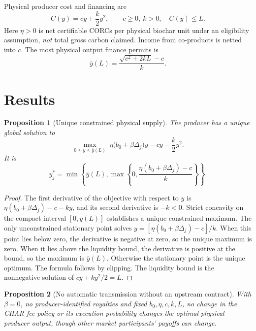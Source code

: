 \documentclass[11pt]{article}
\newtheorem{proposition}{Proposition}
\begin{document}
Physical producer cost and financing are
\begin{equation}
 C(y)=cy+\frac{k}{2}y^2,\qquad c\geq0,\ k>0,\quad C(y)\leq L.
\end{equation}
Here $\eta>0$ is net certifiable CORCs per physical biochar unit under an eligibility assumption, \emph{not} total gross carbon claimed. Income from co-products is netted into $c$. The most physical output finance permits is
\begin{equation}
 \overline y(L)=\frac{\sqrt{c^2+2kL}-c}{k}.
\end{equation}
\section{Results}
\begin{proposition}[Unique constrained physical supply]
The producer has a unique global solution to
\begin{equation}
 \max_{0\leq y\leq\overline y(L)}\;\eta\big(b_0+\beta\Delta_j\big)y-cy-\frac{k}{2}y^2.
\end{equation}
It is
\begin{equation}
 \boxed{y_j^*=\min\left\{\overline y(L),\max\left\{0,\frac{\eta(b_0+\beta\Delta_j)-c}{k}\right\}\right\}.}
\end{equation}
\end{proposition}
\begin{proof}
The first derivative of the objective with respect to $y$ is $\eta(b_0+\beta\Delta_j)-c-ky$, and its second derivative is $-k<0$. Strict concavity on the compact interval $[0,\overline y(L)]$ establishes a unique constrained maximum. The only unconstrained stationary point solves $y=[\eta(b_0+\beta\Delta_j)-c]/k$. When this point lies below zero, the derivative is negative at zero, so the unique maximum is zero. When it lies above the liquidity bound, the derivative is positive at the bound, so the maximum is $\overline y(L)$. Otherwise the stationary point is the unique optimum. The formula follows by clipping. The liquidity bound is the nonnegative solution of $cy+ky^2/2=L$.
\end{proof}
\begin{proposition}[No automatic transmission without an upstream contract]
With $\beta=0$, no producer-identified royalties and fixed $b_0,\eta,c,k,L$, no change in the CHAR fee policy or its execution probability changes the optimal physical producer output, though other market participants' payoffs can change.
\end{proposition}
\end{document}
